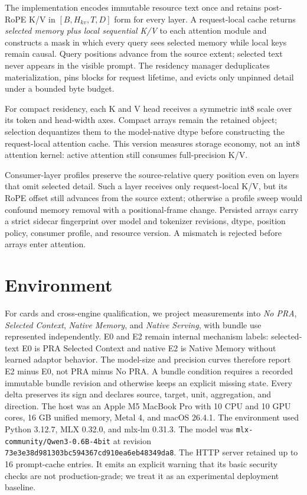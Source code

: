 \documentclass[10pt]{article}
\begin{document}
The implementation encodes immutable resource text once and retains post-RoPE
K/V in $[B,H_{kv},T,D]$ form for every layer. A request-local cache returns
\emph{selected memory plus local sequential K/V} to each attention module and
constructs a mask in which every query sees selected memory while local keys
remain causal. Query positions advance from the source extent; selected text
never appears in the visible prompt. The residency manager deduplicates
materialization, pins blocks for request lifetime, and evicts only unpinned
detail under a bounded byte budget.

For compact residency, each K and V head receives a symmetric int8 scale over
its token and head-width axes. Compact arrays remain the retained object;
selection dequantizes them to the model-native dtype before constructing the
request-local attention cache. This version measures storage economy, not an
int8 attention kernel: active attention still consumes full-precision K/V.

Consumer-layer profiles preserve the source-relative query position even on
layers that omit selected detail. Such a layer receives only request-local K/V,
but its RoPE offset still advances from the source extent; otherwise a profile
sweep would confound memory removal with a positional-frame change. Persisted
arrays carry a strict sidecar fingerprint over model and tokenizer revisions,
dtype, position policy, consumer profile, and resource version. A mismatch is
rejected before arrays enter attention.

\section{Environment}

For cards and cross-engine qualification, we project measurements into
\emph{No PRA}, \emph{Selected Context}, \emph{Native Memory}, and \emph{Native
Serving}, with bundle use represented independently.  E0 and E2 remain
internal mechanism labels: selected-text E0 is PRA Selected Context and native
E2 is Native Memory without learned adaptor behavior.  The model-size and
precision curves therefore report E2 minus E0, not PRA minus No PRA.  A bundle
condition requires a recorded immutable bundle revision and otherwise keeps an
explicit missing state. Every delta preserves its sign and declares source,
target, unit, aggregation, and direction.
The host was an Apple M5 MacBook Pro with 10 CPU and 10 GPU cores, 16 GB unified
memory, Metal 4, and macOS 26.4.1. The environment used Python 3.12.7, MLX
0.32.0, and mlx-lm 0.31.3. The model was
\texttt{mlx-community/Qwen3-0.6B-4bit} at revision
\texttt{73e3e38d981303bc594367cd910ea6eb48349da8}. The HTTP server retained up
to 16 prompt-cache entries. It emits an explicit warning that its basic
security checks are not production-grade; we treat it as an experimental
deployment baseline.
\end{document}
